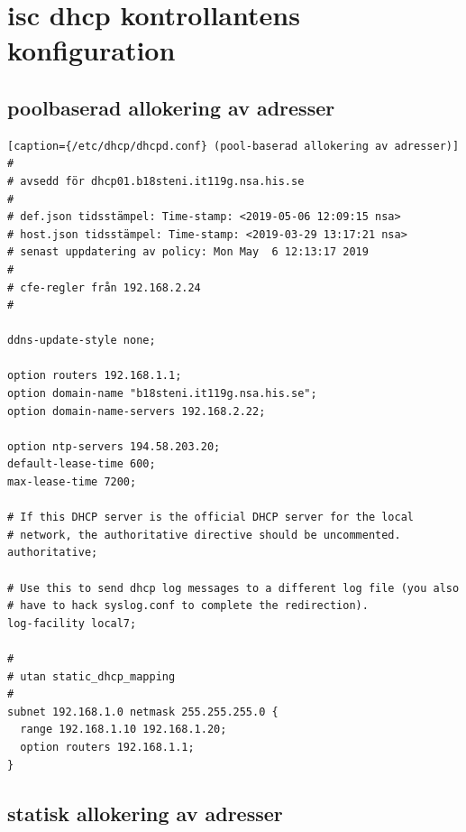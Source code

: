 \documentclass[swedish,10pt,a4paper]{report}
\begin{document}

\section{isc dhcp kontrollantens konfiguration}\label{appendix:isc_dhcpd_config}
\subsection{poolbaserad allokering av adresser}\label{appendix:isc_dhcpd_address_pools}

\begin{lstlisting}[caption={/etc/dhcp/dhcpd.conf} (pool-baserad allokering av adresser)]
#
# avsedd för dhcp01.b18steni.it119g.nsa.his.se
#
# def.json tidsstämpel: Time-stamp: <2019-05-06 12:09:15 nsa>
# host.json tidsstämpel: Time-stamp: <2019-03-29 13:17:21 nsa>
# senast uppdatering av policy: Mon May  6 12:13:17 2019
#
# cfe-regler från 192.168.2.24
#

ddns-update-style none;

option routers 192.168.1.1;
option domain-name "b18steni.it119g.nsa.his.se";
option domain-name-servers 192.168.2.22;

option ntp-servers 194.58.203.20;
default-lease-time 600;
max-lease-time 7200;

# If this DHCP server is the official DHCP server for the local
# network, the authoritative directive should be uncommented.
authoritative;

# Use this to send dhcp log messages to a different log file (you also
# have to hack syslog.conf to complete the redirection).
log-facility local7;

#
# utan static_dhcp_mapping
#
subnet 192.168.1.0 netmask 255.255.255.0 {
  range 192.168.1.10 192.168.1.20;
  option routers 192.168.1.1;
}
\end{lstlisting}

\subsection{statisk allokering av adresser}\label{appendix:dhcp_static_allocation}
\end{document}
